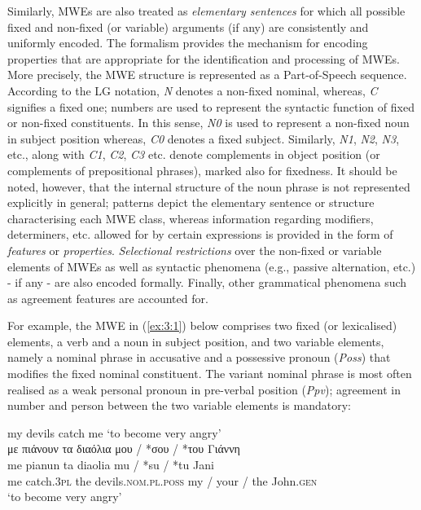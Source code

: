\documentclass[output=paper]{langsci/langscibook}
\begin{document}
Similarly, MWEs are also treated as \textit{elementary
sentences} for which all possible fixed and non-fixed (or variable)
arguments (if any) are consistently and uniformly encoded. The
formalism provides the mechanism for encoding properties that are
appropriate for the identification and processing of MWEs. More
precisely, the MWE structure is represented as a Part-of-Speech sequence.
According to the LG notation, \textit{Ν }denotes a non-fixed nominal,
whereas, \textit{C} signifies a fixed one; numbers are used to
represent the syntactic function of fixed or non-fixed constituents. In
this sense, \textit{N0} is used to represent a non-fixed noun in
subject position whereas, \textit{C0} denotes a fixed subject.
Similarly, \textit{N1}, \textit{N2}, \textit{N3}, etc., along with
\textit{C1}, \textit{C2}, \textit{C3} etc. denote complements in object
position (or complements of prepositional phrases), marked also for
fixedness. It should be noted, however, that the internal structure of
the noun phrase is not represented explicitly in general; patterns
depict the elementary sentence or structure characterising each MWE class,
whereas information regarding modifiers, determiners, etc. allowed for
by certain expressions is provided in the form of
\textit{features} or \textit{properties}.
\textit{Selectional restrictions} over the non-fixed or
variable elements of MWEs as well as syntactic phenomena (e.g., passive
alternation, etc.) - if any - are also encoded formally. Finally, other
grammatical phenomena such as agreement features are accounted for. 



For example, the MWE in (\ref{ex:3:1}) below comprises two fixed (or lexicalised)
elements, a verb and a noun in subject position, and two variable
elements, namely a nominal phrase in accusative and a possessive
pronoun (\textit{Poss}) that modifies the fixed nominal constituent. The variant
nominal phrase is most often realised as a weak personal pronoun in
pre-verbal position (\textit{Ppv}); agreement in number and person between the two variable
elements is mandatory:

\begin{exe}
\ex \label{ex:3:1}
my devils catch me `to become very angry'\\
\glll με πιάνουν τα διαόλια μου / *σου / *του Γιάννη \\
me pianun ta diaolia mu / *su /  *tu Jani\\
me catch.\textsc{3pl} the devils.\textsc{nom.pl.poss} my / your / the John.\textsc{gen}\\
\glt %
`to become very angry'
\end{exe}
\end{document}

